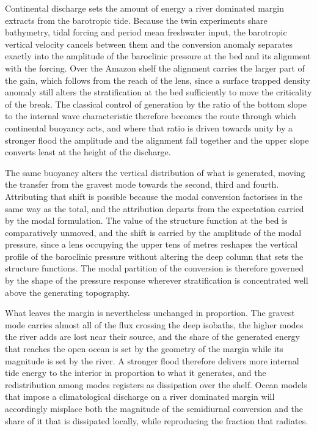 \documentclass[a4paper,fleqn]{cas-sc}
\begin{document}
Continental discharge sets the amount of energy a river dominated margin extracts from the barotropic tide. Because the twin experiments share bathymetry, tidal forcing and period mean freshwater input, the barotropic vertical velocity cancels between them and the conversion anomaly separates exactly into the amplitude of the baroclinic pressure at the bed and its alignment with the forcing. Over the Amazon shelf the alignment carries the larger part of the gain, which follows from the reach of the lens, since a surface trapped density anomaly still alters the stratification at the bed sufficiently to move the criticality of the break. The classical control of generation by the ratio of the bottom slope to the internal wave characteristic therefore becomes the route through which continental buoyancy acts, and where that ratio is driven towards unity by a stronger flood the amplitude and the alignment fall together and the upper slope converts least at the height of the discharge.

The same buoyancy alters the vertical distribution of what is generated, moving the transfer from the gravest mode towards the second, third and fourth. Attributing that shift is possible because the modal conversion factorises in the same way as the total, and the attribution departs from the expectation carried by the modal formulation. The value of the structure function at the bed is comparatively unmoved, and the shift is carried by the amplitude of the modal pressure, since a lens occupying the upper tens of metres reshapes the vertical profile of the baroclinic pressure without altering the deep column that sets the structure functions. The modal partition of the conversion is therefore governed by the shape of the pressure response wherever stratification is concentrated well above the generating topography.

What leaves the margin is nevertheless unchanged in proportion. The gravest mode carries almost all of the flux crossing the deep isobaths, the higher modes the river adds are lost near their source, and the share of the generated energy that reaches the open ocean is set by the geometry of the margin while its magnitude is set by the river. A stronger flood therefore delivers more internal tide energy to the interior in proportion to what it generates, and the redistribution among modes registers as dissipation over the shelf. Ocean models that impose a climatological discharge on a river dominated margin will accordingly misplace both the magnitude of the semidiurnal conversion and the share of it that is dissipated locally, while reproducing the fraction that radiates.
\end{document}
